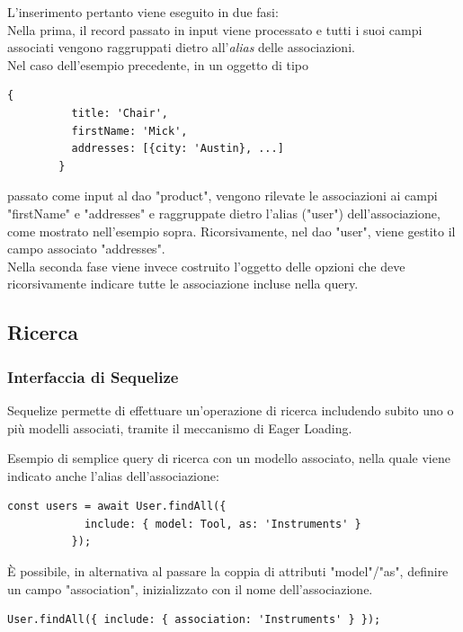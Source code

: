 \documentclass[a4paper, 12pt]{scrartcl}
\begin{document}
      L'inserimento pertanto viene eseguito in due fasi:\\
      Nella prima, il record passato in input viene processato e tutti i suoi campi associati vengono raggruppati dietro all'\emph{alias} delle associazioni.\\
      Nel caso dell'esempio precedente, in un oggetto di tipo
      \begin{Verbatim}[samepage=true]
        {
          title: 'Chair', 
          firstName: 'Mick',
          addresses: [{city: 'Austin}, ...]
        }
      \end{Verbatim}
      passato come input al dao "product", vengono rilevate le associazioni ai campi "firstName" e "addresses" e raggruppate dietro l'alias ("user") dell'associazione, come mostrato nell'esempio sopra.
      Ricorsivamente, nel dao "user", viene gestito il campo associato "addresses".\\

      Nella seconda fase viene invece costruito l'oggetto delle opzioni che deve ricorsivamente indicare tutte le associazione incluse nella query.

    \newpage
    \subsection*{Ricerca}
      \subsubsection*{Interfaccia di Sequelize}
        Sequelize permette di effettuare un'operazione di ricerca includendo subito uno o più modelli associati, tramite il meccanismo di Eager Loading.

        Esempio di semplice query di ricerca con un modello associato, nella quale viene indicato anche l'alias dell'associazione:
        \begin{Verbatim}[samepage=true]
          const users = await User.findAll({
            include: { model: Tool, as: 'Instruments' }
          });
        \end{Verbatim}
        
        È possibile, in alternativa al passare la coppia di attributi "model"/"as", definire un campo "association", inizializzato con il nome dell'associazione.
        \begin{Verbatim}[samepage=true]
          User.findAll({ include: { association: 'Instruments' } });
        \end{Verbatim}
\end{document}
